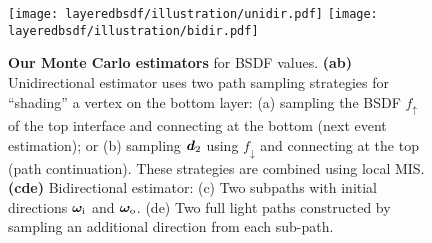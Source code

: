 \begin{figure}[!ht]
	\centering
	\texttt{[image: layeredbsdf/illustration/unidir.pdf]}
	\texttt{[image: layeredbsdf/illustration/bidir.pdf]}
	\caption[Our Monte Carlo estimators]{\label{fig:layeredbsdf:mc_estimators}
		\textbf{Our Monte Carlo estimators} for BSDF values.
		\textbf{(ab)} Unidirectional estimator uses two path sampling strategies for ``shading'' a vertex on the bottom layer:
		(a) sampling the BSDF $f_\uparrow$ of the top interface and connecting at the bottom (next event estimation); or (b) sampling $\bm{d}_2$ using $f_\downarrow$ and connecting at the top (path continuation). These strategies are combined using local MIS. \textbf{(cde)} Bidirectional estimator: (c) Two subpaths with initial directions $\bm\omega_\mathrm{i}$ and $\bm\omega_\mathrm{o}$. (de) Two full light paths constructed by sampling an additional direction from each sub-path.
	}
\end{figure}
